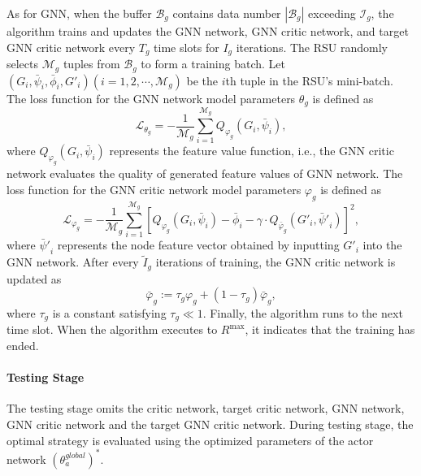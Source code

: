 \documentclass[lettersize,journal,onecolumn]{IEEEtran}
\begin{document}
As for GNN, when the buffer ${{\mathcal{B}}_{g}}$ contains data number $|{{\mathcal{B}}_{g}}|$ exceeding ${{\mathcal{I}}_{g}}$, the algorithm trains and updates the GNN network, GNN critic network, and target GNN critic network every ${{T}_{g}}$ time slots for ${{I}_{g}}$ iterations. The RSU randomly selects ${{\mathcal{M}}_{g}}$ tuples from  ${{\mathcal{B}}_{g}}$ to form a training batch. Let $\left( {{G}_{i}},{{{\bar{\psi }}}_{i}},{{{\bar{\phi }}}_{i}},{{{{G}'}}_{i}} \right)(i=1,2,\cdots ,{{\mathcal{M}}_{g}})$ be the $i$th tuple in the RSU's mini-batch. The loss function for the GNN network model parameters ${{\theta }_{g}}$ is defined as
\begin{equation}
{{\mathcal{L}}_{{{\theta }_{g}}}}=-\frac{1}{{{\mathcal{M}}_{g}}}\sum\limits_{i=1}^{{{\mathcal{M}}_{g}}}{{{Q}_{{{\varphi }_{g}}}}}({{G}_{i}},{{\bar{\psi }}_{i}})
\label{eq36},	
\end{equation}
where ${{Q}_{{{\varphi }_{g}}}}({{G}_{i}},{{\bar{\psi }}_{i}})$ represents the feature value function, i.e., the GNN critic network evaluates the quality of generated feature values of GNN network. The loss function for the GNN critic network model parameters ${{\varphi }_{g}}$ is defined as
\begin{equation}
{{\mathcal{L}}_{{{\varphi }_{g}}}}=-\frac{1}{{{\mathcal{M}}_{g}}}\sum\limits_{i=1}^{{{\mathcal{M}}_{g}}}{{{\left[ {{Q}_{{{\varphi }_{g}}}}({{G}_{i}},{{{\bar{\psi }}}_{i}})-{{{\bar{\phi }}}_{i}}-\gamma \cdot {{Q}_{{{{\bar{\varphi }}}_{g}}}}({{{{G}'}}_{i}},{{{{\bar{\psi }}'}}_{i}}) \right]}^{2}}}
\label{eq37},	
\end{equation}
where ${{{\bar{\psi }}'}_{i}}$ represents the node feature vector obtained by inputting ${{{G}'}_{i}}$ into the GNN network. After every ${{\tilde{I}}_{g}}$ iterations of training, the GNN critic network is updated as
\begin{equation}
{{\bar{\varphi }}_{g}}:={{\tau }_{g}}{{\varphi }_{g}}+\left( 1-{{\tau }_{g}} \right){{\bar{\varphi }}_{g}}
\label{eq38},	
\end{equation}
where ${{\tau }_{g}}$ is a constant satisfying ${{\tau }_{g}}\ll 1$. Finally, the algorithm runs to the next time slot. When the algorithm executes to $R^{\max}$, it indicates that the training has ended.

\paragraph{Testing Stage}
The testing stage omits the critic network, target critic network, GNN network, GNN critic network and the target GNN critic network. During testing stage, the optimal strategy is evaluated using the optimized parameters of the actor network ${{(\theta _{a}^{global})}^{*}}$. 
%
\end{document}

